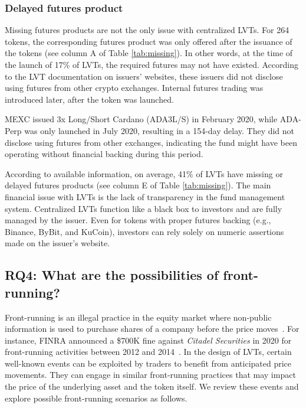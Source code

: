 \subsubsection{Delayed futures product}
Missing futures products are not the only issue with centralized LVTs. For 264 tokens, the corresponding futures product was only offered after the issuance of the tokens (see column A of Table \ref{tab:missing}). In other words, at the time of the launch of 17\% of LVTs, the required futures may not have existed. According to the LVT documentation on issuers' websites, these issuers did not disclose using futures from other crypto exchanges. Internal futures trading was introduced later, after the token was launched.

\begin{example}
	MEXC issued 3x Long/Short Cardano (ADA3L/S) in February 2020, while ADA-Perp was only launched in July 2020, resulting in a 154-day delay. They did not disclose using futures from other exchanges, indicating the fund might have been operating without financial backing during this period.
\end{example}

According to available information, on average, 41\% of LVTs have missing or delayed futures products (see column E of Table \ref{tab:missing}). The main financial issue with LVTs is the lack of transparency in the fund management system. Centralized LVTs function like a black box to investors and are fully managed by the issuer. Even for tokens with proper futures backing (e.g., Binance, ByBit, and KuCoin), investors can rely solely on numeric assertions made on the issuer's website.

\subsection{RQ4: What are the possibilities of front-running?}\label{subsec:frontrunning}
Front-running is an illegal practice in the equity market where non-public information is used to purchase shares of a company before the price moves~\cite{eskandari2019sok,zhou2021high,baum2022sok}. For instance, FINRA announced a \$700K fine against \textsl{Citadel Securities} in 2020 for front-running activities between 2012 and 2014~\cite{Investo_FrontRunning}. In the design of LVTs, certain well-known events can be exploited by traders to benefit from anticipated price movements. They can engage in similar front-running practices that may impact the price of the underlying asset and the token itself. We review these events and explore possible front-running scenarios as follows.

